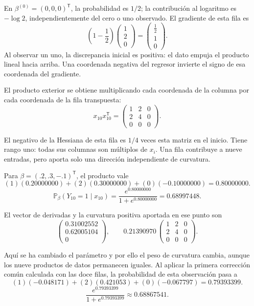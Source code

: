 \documentclass[11pt,a4paper]{article}
\newcommand{\Prob}{\mathbb P}
\newcommand{\T}{^{\mathsf T}}
\begin{document}
En \(\beta^{(0)}=(0,0,0)\T\), la probabilidad es \(1/2\);
la contribución al logaritmo es \(-\log2\), independientemente
del cero o uno observado. El gradiente de esta fila es
\[
\left(1-\frac12\right)\begin{pmatrix}1\\2\\0\end{pmatrix}=\begin{pmatrix}\frac{1}{2}\\1\\0\end{pmatrix}.
\]
Al observar un uno, la discrepancia inicial es positiva: el dato empuja el producto lineal hacia arriba. Una coordenada negativa del regresor invierte el signo de esa coordenada del gradiente.

El producto exterior se obtiene multiplicando cada coordenada
de la columna por cada coordenada de la fila transpuesta:
\[
x_{10}x_{10}\T=\begin{pmatrix}1&2&0\\2&4&0\\0&0&0\end{pmatrix}.
\]

El negativo de la Hessiana de esta fila es \(1/4\)
veces esta matriz en el inicio. Tiene rango uno:
todas sus columnas son múltiplos de \(x_i\).
Una fila contribuye a nueve entradas, pero aporta
solo una dirección independiente de curvatura.

Para \(\beta=(.2,.3,-.1)\T\), el producto vale
\[
(1)(0.20000000)+(2)(0.30000000)+(0)(-0.10000000)=0.80000000.
\]
\[
\Prob_\beta(Y_{10}=1\mid x_{10})=\frac{e^{0.80000000}}{1+e^{0.80000000}}=0.68997448.
\]

El vector de derivadas y la curvatura positiva aportada
en ese punto son
\[
\begin{pmatrix}0.31002552\\0.62005104\\0\end{pmatrix},\qquad 0.21390970\,\begin{pmatrix}1&2&0\\2&4&0\\0&0&0\end{pmatrix}.
\]

Aquí se ha cambiado el parámetro y por ello el peso de
curvatura cambia, aunque los nueve productos de datos
permanecen iguales.
Al aplicar la primera corrección común calculada con las doce filas,
la probabilidad de esta observación pasa a
\[
(1)(-0.048171)+(2)(0.421053)+(0)(-0.067797)=0.79393399.
\]
\[
\frac{e^{0.79393399}}{1+e^{0.79393399}}\approx0.68867541.
\]
\end{document}
